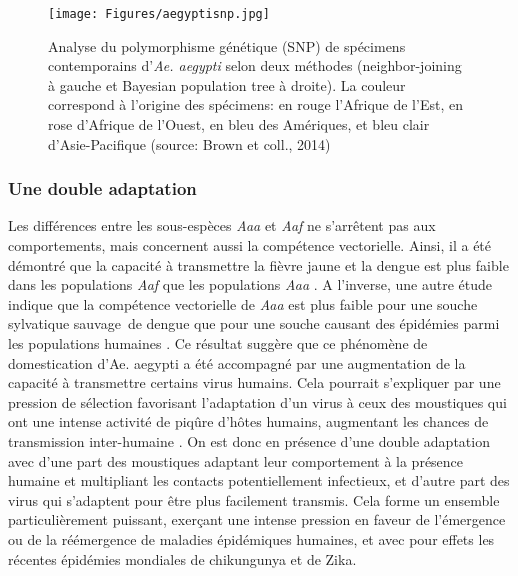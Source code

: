 \begin{figure}[t]
	\centering
	\texttt{[image: Figures/aegyptisnp.jpg]}
	\caption[Analyse du polymorphisme génétique d'{\em Ae. aegypti} (source: Brown et coll., 2014)]{Analyse du polymorphisme génétique (SNP) de spécimens contemporains d'{\em Ae. aegypti} selon deux méthodes (\guillemotleft neighbor-joining\guillemotright \;  à gauche et \guillemotleft Bayesian population tree\guillemotright \; à droite). La couleur correspond à l'origine des spécimens: en rouge l'Afrique de l'Est, en rose d'Afrique de l'Ouest, en bleu des Amériques, et bleu clair d'Asie-Pacifique (source: Brown et coll., 2014)}
	\label{fig:aegyptisnp}
\end{figure}


\subsubsection{Une double adaptation}

Les différences entre les sous-espèces {\em Aaa} et {\em Aaf} ne s'arrêtent pas aux comportements, mais concernent aussi la compétence vectorielle. 
Ainsi, il a été démontré que la capacité à transmettre la fièvre jaune et la dengue est plus faible dans les populations {\em Aaf} que les populations {\em Aaa} \cite{black2002flavivirus}.
A l'inverse, une autre étude indique que la compétence vectorielle de {\em Aaa} est plus faible pour une souche sylvatique \guillemotleft sauvage\guillemotright \;\, de dengue que pour une souche causant des épidémies parmi les populations humaines \cite{moncayo2004dengue}.
Ce résultat suggère que ce phénomène de domestication d'{Ae. aegypti} a été accompagné par une augmentation de la capacité à transmettre certains virus humains.
Cela pourrait s'expliquer par une pression de sélection favorisant l'adaptation d'un virus à ceux des moustiques qui ont une intense activité de piqûre d'hôtes humains, augmentant les chances de transmission inter-humaine \cite{powell2013history}.
On est donc en présence d'une double adaptation avec d'une part des moustiques adaptant leur comportement à la présence humaine et multipliant les contacts potentiellement infectieux, et d'autre part des virus qui s'adaptent pour être plus facilement transmis. 
Cela forme un ensemble particulièrement puissant, exerçant une intense pression en faveur de l'émergence ou de la réémergence de maladies épidémiques humaines, et avec pour effets les récentes épidémies mondiales de chikungunya et de Zika.



